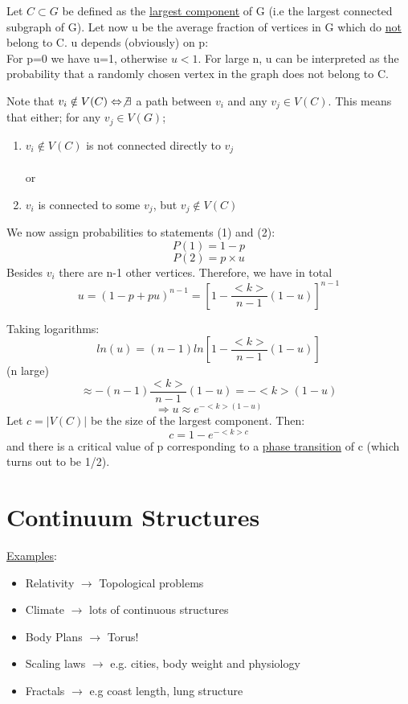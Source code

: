 \documentclass[11pt]{book}
\begin{document}
Let $C \subset G$ be defined as the \underline{largest component} of G (i.e the largest connected subgraph of G). Let now u be the average fraction of vertices in G which do \underline{not} belong to C. u depends (obviously) on p:\\
For p=0 we have u=1, otherwise $u < 1$. For large n, u can be interpreted as the probability that a randomly chosen vertex in the graph does not belong to C.

Note that $v_{i} \notin V(C) \Leftrightarrow  \not\exists $ a path between $v_{i}$ and any $v_{j}\in V(C)$. This means that either; for any $v_{j}\in V(G)$;
\begin{enumerate}
\item $v_{i} \notin V(C)$ is not connected directly to $v_{j}$\\
\\or
\item $v_{i}$ is connected to some $v_{j}$, but $v_{j}\notin V(C)$
\end{enumerate}
We now assign probabilities to statements (1) and (2):\\
$$P(1)= 1-p$$
$$P(2) = p\times u$$
Besides $v_{i}$ there are n-1 other vertices. Therefore, we have in total $$ u= (1-p+pu)^{n-1} = [1-\frac{<k>}{n-1}(1-u)]^{n-1}$$

Taking logarithms: $$ln(u) = (n-1)ln[1-\frac{<k>}{n-1}(1-u)]$$
(n large) $$\approx -(n-1)\frac{<k>}{n-1}(1-u) = -<k>(1-u)$$
$$ \Rightarrow u \approx e^{-<k>(1-u)}$$
Let $c = |V(C)|$ be the size of the largest component. Then: $$ c=1-e^{-<k>c}$$
and there is a critical value of p corresponding to a \underline{phase transition} of c (which turns out to be 1/2).

\section{Continuum Structures}

\underline{Examples}:
\begin{itemize}
\item Relativity $\rightarrow$ Topological problems
\item Climate $\rightarrow$ lots of continuous structures
\item Body Plans $\rightarrow$ Torus!
\item Scaling laws $\rightarrow$  e.g. cities, body weight and physiology
\item Fractals $\rightarrow$ e.g coast length, lung structure
\end{itemize}
\end{document}
